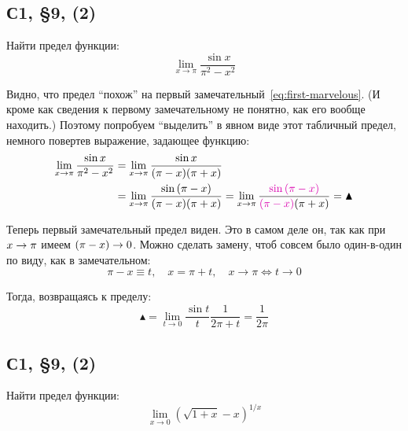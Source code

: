 \documentclass[a4paper,12pt]{article}
\begin{document}
  \subsection{С1, \S 9, (2)}

  Найти предел функции:
  \[
    \lim_{x \to \pi} \frac{\sin x}{\pi^2 - x^2}
  \]

  \begin{solution}
    Видно, что предел ``похож'' на первый замечательный~\eqref{eq:first-marvelous}.
    (И кроме как сведения к первому замечательному не понятно, как его вообще находить.)
    Поэтому попробуем ``выделить'' в явном виде этот табличный предел, немного повертев выражение, задающее функцию:
    \begin{equation*}
    \begin{split}
      \lim_{x \to \pi} \frac{\sin x}{\pi^2 - x^2}
        &= \lim_{x \to \pi} \frac{\sin x}{(\pi - x) (\pi + x)}\\
        &= \lim_{x \to \pi} \frac{\sin{(\pi - x)}}{(\pi - x) (\pi + x)}
        = \lim_{x \to \pi} \frac{\textcolor{pink}{\sin{(\pi - x)}}}{\textcolor{pink}{(\pi - x)} (\pi + x)}
        = \blacktriangle
    \end{split}
    \end{equation*}

    Теперь первый замечательный предел виден.
    Это в самом деле он, так как при $x \hm\to \pi$ имеем $(\pi \hm- x) \hm\to 0$.
    Можно сделать замену, чтоб совсем было один-в-один по виду, как в замечательном:
    \[
      \pi - x \equiv t,\quad x = \pi + t,\quad x \to \pi \Leftrightarrow t \to 0
    \]

    Тогда, возвращаясь к пределу:
    \[
      \blacktriangle = \lim_{t \to 0} \frac{\sin t}{t} \frac{1}{2 \pi + t}
        = \frac{1}{2 \pi}
    \]
  \end{solution}


  \subsection{С1, \S 9, (2)}

  Найти предел функции:
  \[
    \lim_{x \to 0} \left(\sqrt{1 + x} - x\right)^{1 / x}
  \]
\end{document}
